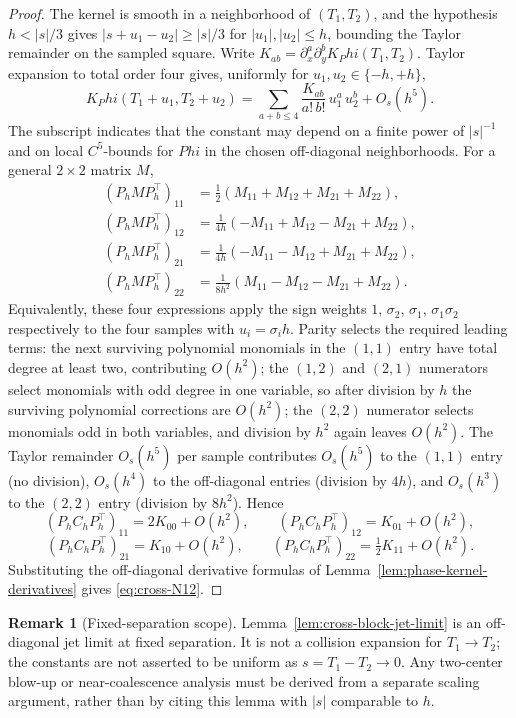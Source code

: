 \documentclass[11pt,a4paper]{amsart}
\def\Phi{Phi}%
\numberwithin{equation}{section}
\theoremstyle{plain}
\theoremstyle{definition}
\newtheorem{remark}[theorem]{Remark}
\newcommand{\Ph}{\Phi}
\begin{document}
\begin{proof}
The kernel is smooth in a neighborhood of \((T_1, T_2)\), and the
hypothesis \(h<|s|/3\) gives
\(|s+u_1-u_2|\ge |s|/3\) for \(|u_1|,|u_2|\le h\), bounding the
Taylor remainder on the sampled square.  Write
\(K_{ab} = \partial_x^a \partial_y^b K_\Ph(T_1, T_2)\).  Taylor
expansion to total order four gives, uniformly for
\(u_1, u_2 \in \{-h, +h\}\),
\[
K_\Ph(T_1+u_1, T_2+u_2)
= \sum_{a+b\le 4}\frac{K_{ab}}{a!\,b!}\, u_1^a\, u_2^b + O_s(h^5).
\]
The subscript indicates that the constant may depend on a finite power
of \(|s|^{-1}\) and on local \(C^5\)-bounds for \(\Ph\) in the chosen
off-diagonal neighborhoods.  For a general \(2\times 2\) matrix \(M\),
\begin{align*}
(P_h M P_h^\top)_{11}
&= \tfrac12(M_{11} + M_{12} + M_{21} + M_{22}),\\
(P_h M P_h^\top)_{12}
&= \tfrac{1}{4h}(-M_{11} + M_{12} - M_{21} + M_{22}),\\
(P_h M P_h^\top)_{21}
&= \tfrac{1}{4h}(-M_{11} - M_{12} + M_{21} + M_{22}),\\
(P_h M P_h^\top)_{22}
&= \tfrac{1}{8h^2}(M_{11} - M_{12} - M_{21} + M_{22}).
\end{align*}
Equivalently, these four expressions apply the sign weights
\(1\), \(\sigma_2\), \(\sigma_1\), \(\sigma_1\sigma_2\) respectively to
the four samples with \(u_i = \sigma_i h\).  Parity selects the
required leading terms: the next surviving polynomial monomials in the
\((1,1)\) entry have total degree at least two, contributing \(O(h^2)\);
the \((1,2)\) and \((2,1)\) numerators select monomials with odd
degree in one variable, so after division by \(h\) the surviving
polynomial corrections are \(O(h^2)\); the \((2,2)\) numerator selects
monomials odd in both variables, and division by \(h^2\) again leaves
\(O(h^2)\).  The Taylor remainder \(O_s(h^5)\) per sample contributes
\(O_s(h^5)\) to the \((1,1)\) entry (no division), \(O_s(h^4)\) to the
off-diagonal entries (division by \(4h\)), and \(O_s(h^3)\) to the
\((2,2)\) entry (division by \(8h^2\)).  Hence
\[
(P_h C_h P_h^\top)_{11} = 2 K_{00} + O(h^2),\qquad
(P_h C_h P_h^\top)_{12} = K_{01} + O(h^2),
\]
\[
(P_h C_h P_h^\top)_{21} = K_{10} + O(h^2),\qquad
(P_h C_h P_h^\top)_{22} = \tfrac12 K_{11} + O(h^2).
\]
Substituting the off-diagonal derivative formulas of
Lemma~\ref{lem:phase-kernel-derivatives} gives \eqref{eq:cross-N12}.
\end{proof}

\begin{remark}[Fixed-separation scope]
\label{rem:cross-block-fixed-separation-scope}
Lemma~\ref{lem:cross-block-jet-limit} is an off-diagonal jet limit at
fixed separation.  It is not a collision expansion for \(T_1\to T_2\);
the constants are not asserted to be uniform as \(s=T_1-T_2\to 0\).
Any two-center blow-up or near-coalescence analysis must be derived
from a separate scaling argument, rather than by citing this lemma
with \(|s|\) comparable to \(h\).
\end{remark}
\end{document}

